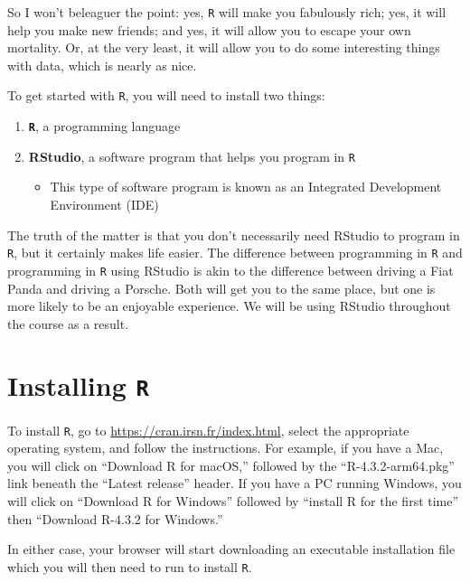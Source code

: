 \documentclass[
]{book}
\providecommand{\tightlist}{%
  \setlength{\itemsep}{0pt}\setlength{\parskip}{0pt}}
\begin{document}
So I won't beleaguer the point: yes, \texttt{R} will make you fabulously rich; yes, it will help you make new friends; and yes, it will allow you to escape your own mortality. Or, at the very least, it will allow you to do some interesting things with data, which is nearly as nice.

To get started with \texttt{R}, you will need to install two things:

\begin{enumerate}
\def\labelenumi{\arabic{enumi}.}
\item
  \textbf{\texttt{R}}, a programming language
\item
  \textbf{RStudio}, a software program that helps you program in \texttt{R}

  \begin{itemize}
  \tightlist
  \item
    This type of software program is known as an Integrated Development Environment (IDE)
  \end{itemize}
\end{enumerate}

The truth of the matter is that you don't necessarily need RStudio to program in \texttt{R}, but it certainly makes life easier. The difference between programming in \texttt{R} and programming in \texttt{R} using RStudio is akin to the difference between driving a Fiat Panda and driving a Porsche. Both will get you to the same place, but one is more likely to be an enjoyable experience. We will be using RStudio throughout the course as a result.

\hypertarget{installing-r}{%
\section{\texorpdfstring{Installing \texttt{R}}{Installing R}}\label{installing-r}}

To install \texttt{R}, go to \url{https://cran.irsn.fr/index.html}, select the appropriate operating system, and follow the instructions. For example, if you have a Mac, you will click on ``Download R for macOS,'' followed by the ``R-4.3.2-arm64.pkg'' link beneath the ``Latest release'' header. If you have a PC running Windows, you will click on ``Download R for Windows'' followed by ``install R for the first time'' then ``Download R-4.3.2 for Windows.''

In either case, your browser will start downloading an executable installation file which you will then need to run to install \texttt{R}.
\end{document}
